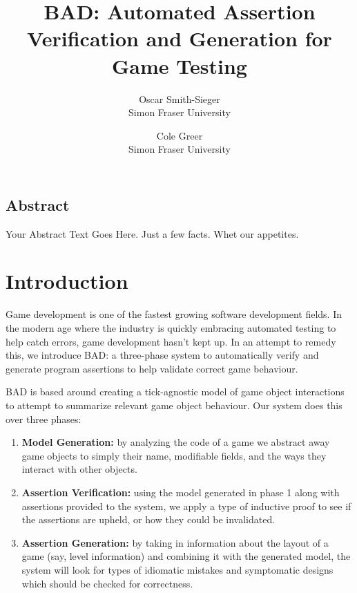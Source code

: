 \documentclass[letterpaper,twocolumn,10pt]{article}
\begin{document}
\date{}

\title{\Large \bf BAD: Automated Assertion Verification and Generation for Game Testing}

\author{
{\rm Oscar Smith-Sieger}\\
Simon Fraser University
\and
{\rm Cole Greer}\\
Simon Fraser University
} %

\maketitle

\thispagestyle{empty}


\subsection*{Abstract}
Your Abstract Text Goes Here.  Just a few facts.
Whet our appetites.

\section{Introduction}


Game development is one of the fastest growing software development fields. In the modern age where the industry is quickly embracing automated testing to help catch errors, game development hasn't kept up. In an attempt to remedy this, we introduce BAD: a three-phase system to automatically verify and generate program assertions to help validate correct game behaviour.

BAD is based around creating a tick-agnostic model of game object interactions to attempt to summarize relevant game object behaviour. Our system does this over three phases:

\begin{enumerate}
    \item{\textbf{Model Generation:}} by analyzing the code of a game we abstract away game objects to simply their name, modifiable fields, and the ways they interact with other objects. 
    \item {\textbf{Assertion Verification:}} using the model generated in phase 1 along with assertions provided to the system, we apply a type of inductive proof to see if the assertions are upheld, or how they could be invalidated.
    \item{\textbf{Assertion Generation:}} by taking in information about the layout of a game (say, level information) and combining it with the generated model, the system will look for types of idiomatic mistakes and symptomatic designs which should be checked for correctness.
\end{enumerate}
\end{document}
